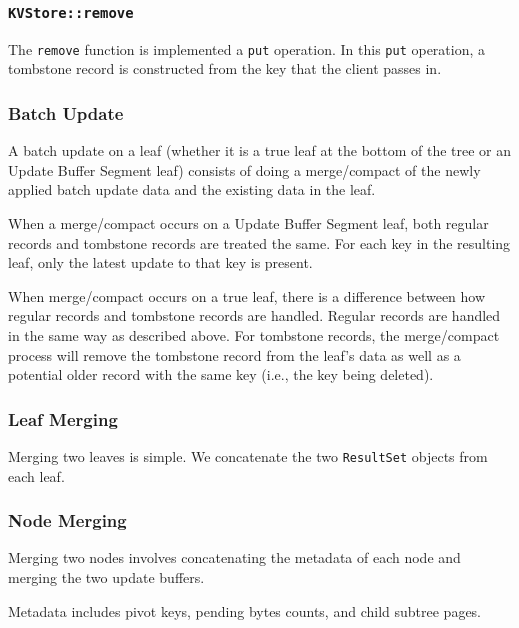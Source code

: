 \documentclass[11pt]{article}
\begin{document}
\subsubsection{\texttt{KVStore::remove}}

The \texttt{remove} function is implemented a \texttt{put} operation. In this \texttt{put} operation, a tombstone record is constructed from the key that the client passes in.

\subsubsection{Batch Update}

A batch update on a leaf (whether it is a true leaf at the bottom of the tree or an Update Buffer Segment leaf) consists of doing a merge/compact of the newly applied batch update data and the existing data in the leaf.

When a merge/compact occurs on a Update Buffer Segment leaf, both regular records and tombstone records are treated the same. For each key in the resulting leaf, only the latest update to that key is present.

When merge/compact occurs on a true leaf, there is a difference between how regular records and tombstone records are handled. Regular records are handled in the same way as described above. For tombstone records, the merge/compact process will remove the tombstone record from the leaf's data as well as a potential older record with the same key (i.e., the key being deleted).

\subsubsection{Leaf Merging}

Merging two leaves is simple. We concatenate the two \texttt{ResultSet} objects from each leaf.

\subsubsection{Node Merging}\label{section:newturtletreealogs:nodemerge}

Merging two nodes involves concatenating the metadata of each node and merging the two update buffers.

Metadata includes pivot keys, pending bytes counts, and child subtree pages.
\end{document}
